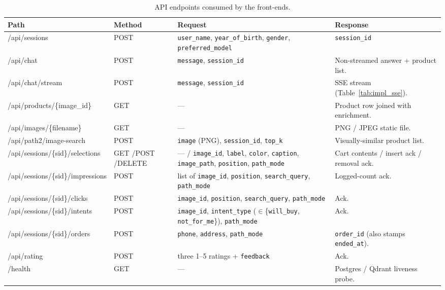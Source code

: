 \begin{table}[H]
\centering
\caption{API endpoints consumed by the front-ends.}
\label{tab:impl_endpoints}
\footnotesize
\setlength{\tabcolsep}{4pt}
\begin{tabular}{>{\raggedright\arraybackslash\ttfamily}p{4.6cm} >{\raggedright\arraybackslash}p{1.6cm} >{\raggedright\arraybackslash}p{4.0cm} >{\raggedright\arraybackslash}p{4.0cm}}
\toprule
\textbf{\normalfont Path} & \textbf{Method} & \textbf{Request} & \textbf{Response} \\
\midrule
/api/sessions & POST & \texttt{user\_name}, \texttt{year\_of\_birth}, \texttt{gender}, \texttt{preferred\_model} & \texttt{session\_id} \\
/api/chat & POST & \texttt{message}, \texttt{session\_id} & Non-streamed answer + product list. \\
/api/chat/stream & POST & \texttt{message}, \texttt{session\_id} & SSE stream (Table~\ref{tab:impl_sse}). \\
/api/products/\{image\_\allowbreak id\} & GET & --- & Product row joined with enrichment. \\
/api/images/\{filename\} & GET & --- & PNG / JPEG static file. \\
/api/path2/image-search & POST & \texttt{image} (PNG), \texttt{session\_id}, \texttt{top\_k} & Visually-similar product list. \\
/api/sessions/\{sid\}/\allowbreak selections & GET /\newline POST /\newline DELETE & --- / \texttt{image\_id}, \texttt{label}, \texttt{color}, \texttt{caption}, \texttt{image\_path}, \texttt{position}, \texttt{path\_mode} & Cart contents / insert ack / removal ack. \\
/api/sessions/\{sid\}/\allowbreak impressions & POST & list of \texttt{image\_id}, \texttt{position}, \texttt{search\_query}, \texttt{path\_mode} & Logged-count ack. \\
/api/sessions/\{sid\}/\allowbreak clicks & POST & \texttt{image\_id}, \texttt{position}, \texttt{search\_query}, \texttt{path\_mode} & Ack. \\
/api/sessions/\{sid\}/\allowbreak intents & POST & \texttt{image\_id}, \texttt{intent\_type} ($\in$\{\texttt{will\_buy}, \texttt{not\_for\_me}\}), \texttt{path\_mode} & Ack. \\
/api/sessions/\{sid\}/\allowbreak orders & POST & \texttt{phone}, \texttt{address}, \texttt{path\_mode} & \texttt{order\_id} (also stamps \texttt{ended\_at}). \\
/api/rating & POST & three 1--5 ratings + \texttt{feedback} & Ack. \\
/health & GET & --- & Postgres / Qdrant liveness probe. \\
\bottomrule
\end{tabular}
\end{table}

